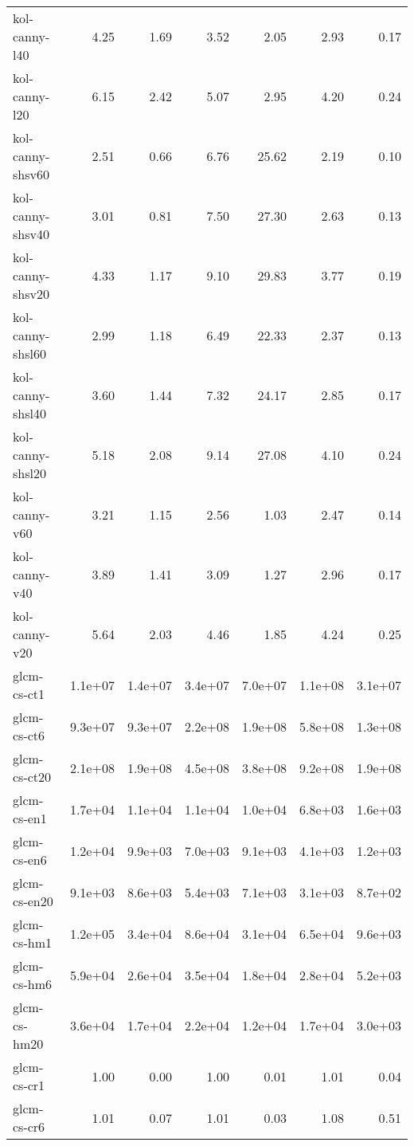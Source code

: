 \begin{tabular}{lrrrrrr}
kol-canny-l40       &    4.25 &    1.69 &    3.52 &    2.05 &    2.93 &    0.17 \\
kol-canny-l20       &    6.15 &    2.42 &    5.07 &    2.95 &    4.20 &    0.24 \\
kol-canny-shsv60    &    2.51 &    0.66 &    6.76 &   25.62 &    2.19 &    0.10 \\
kol-canny-shsv40    &    3.01 &    0.81 &    7.50 &   27.30 &    2.63 &    0.13 \\
kol-canny-shsv20    &    4.33 &    1.17 &    9.10 &   29.83 &    3.77 &    0.19 \\
kol-canny-shsl60    &    2.99 &    1.18 &    6.49 &   22.33 &    2.37 &    0.13 \\
kol-canny-shsl40    &    3.60 &    1.44 &    7.32 &   24.17 &    2.85 &    0.17 \\
kol-canny-shsl20    &    5.18 &    2.08 &    9.14 &   27.08 &    4.10 &    0.24 \\
kol-canny-v60       &    3.21 &    1.15 &    2.56 &    1.03 &    2.47 &    0.14 \\
kol-canny-v40       &    3.89 &    1.41 &    3.09 &    1.27 &    2.96 &    0.17 \\
kol-canny-v20       &    5.64 &    2.03 &    4.46 &    1.85 &    4.24 &    0.25 \\
glcm-cs-ct1         & 1.1e+07 & 1.4e+07 & 3.4e+07 & 7.0e+07 & 1.1e+08 & 3.1e+07 \\
glcm-cs-ct6         & 9.3e+07 & 9.3e+07 & 2.2e+08 & 1.9e+08 & 5.8e+08 & 1.3e+08 \\
glcm-cs-ct20        & 2.1e+08 & 1.9e+08 & 4.5e+08 & 3.8e+08 & 9.2e+08 & 1.9e+08 \\
glcm-cs-en1         & 1.7e+04 & 1.1e+04 & 1.1e+04 & 1.0e+04 & 6.8e+03 & 1.6e+03 \\
glcm-cs-en6         & 1.2e+04 & 9.9e+03 & 7.0e+03 & 9.1e+03 & 4.1e+03 & 1.2e+03 \\
glcm-cs-en20        & 9.1e+03 & 8.6e+03 & 5.4e+03 & 7.1e+03 & 3.1e+03 & 8.7e+02 \\
glcm-cs-hm1         & 1.2e+05 & 3.4e+04 & 8.6e+04 & 3.1e+04 & 6.5e+04 & 9.6e+03 \\
glcm-cs-hm6         & 5.9e+04 & 2.6e+04 & 3.5e+04 & 1.8e+04 & 2.8e+04 & 5.2e+03 \\
glcm-cs-hm20        & 3.6e+04 & 1.7e+04 & 2.2e+04 & 1.2e+04 & 1.7e+04 & 3.0e+03 \\
glcm-cs-cr1         &    1.00 &    0.00 &    1.00 &    0.01 &    1.01 &    0.04 \\
glcm-cs-cr6         &    1.01 &    0.07 &    1.01 &    0.03 &    1.08 &    0.51 \\

\end{tabular}
